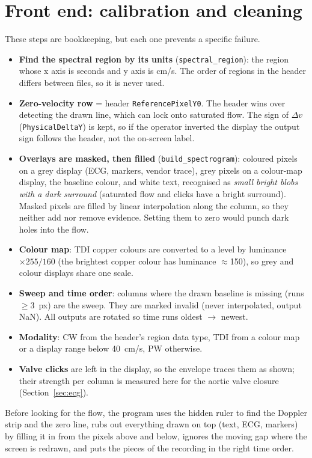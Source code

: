 \documentclass[11pt,a4paper]{article}
\newcommand{\code}[1]{\texttt{\small #1}}
\begin{document}
\section{Front end: calibration and cleaning}
\label{sec:front}
These steps are bookkeeping, but each one prevents a specific failure.
\begin{itemize}
\item \textbf{Find the spectral region by its units} (\code{spectral\_region}): the region whose x axis is seconds
and y axis is cm/s. The order of regions in the header differs between files, so it is never used.
\item \textbf{Zero-velocity row} = header \code{ReferencePixelY0}. The header wins over detecting the drawn line,
which can lock onto saturated flow. The sign of $\Delta v$ (\code{PhysicalDeltaY}) is kept, so if the operator
inverted the display the output sign follows the header, not the on-screen label.
\item \textbf{Overlays are masked, then filled} (\code{build\_spectrogram}): coloured pixels on a grey display (ECG,
markers, vendor trace), grey pixels on a colour-map display, the baseline colour, and white text, recognised as
\emph{small bright blobs with a dark surround} (saturated flow and clicks have a bright surround). Masked pixels are
filled by linear interpolation along the column, so they neither add nor remove evidence. Setting them to zero
would punch dark holes into the flow.
\item \textbf{Colour map}: TDI copper colours are converted to a level by luminance $\times 255/160$ (the brightest
copper colour has luminance $\approx$150), so grey and colour displays share one scale.
\item \textbf{Sweep and time order}: columns where the drawn baseline is missing (runs $\ge$3~px) are the sweep. They
are marked invalid (never interpolated, output NaN). All outputs are rotated so time runs oldest $\to$ newest.
\item \textbf{Modality}: CW from the header's region data type, TDI from a colour map or a display range below
40~cm/s, PW otherwise.
\item \textbf{Valve clicks} are left in the display, so the envelope traces them as shown; their strength per column
is measured here for the aortic valve closure (Section~\ref{sec:ecg}).
\end{itemize}

\begin{plainbox}
Before looking for the flow, the program uses the hidden ruler to find the Doppler strip and the zero line, rubs out
everything drawn on top (text, ECG, markers) by filling it in from the pixels above and below, ignores the moving gap
where the screen is redrawn, and puts the pieces of the recording in the right time order.
\end{plainbox}
\end{document}

